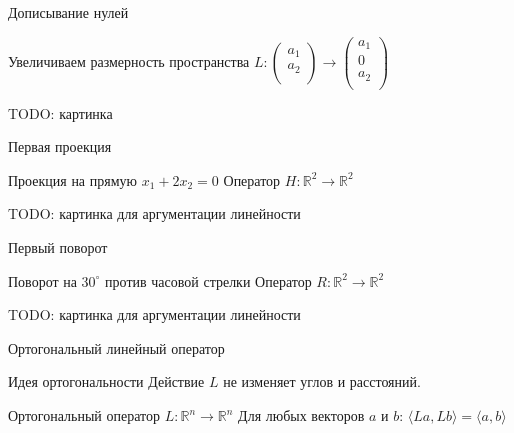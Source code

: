 \documentclass[14pt,xcolor=dvipsnames]{beamer}
\newcommand\R{\mathbb{R}}
\begin{document}
\begin{frame}{Дописывание нулей}

\begin{block}{Увеличиваем размерность пространства}
  $L : \begin{pmatrix}
    a_1 \\
    a_2 \\
  \end{pmatrix} \to 
  \begin{pmatrix}
    a_1 \\
    0  \\
    a_2 \\
  \end{pmatrix}$
\end{block}

\begin{block}{TODO: картинка}

\end{block}
    
\end{frame}
  



\begin{frame}{Первая проекция}

\begin{block}{Проекция на прямую $x_1 + 2x_2 = 0$}
Оператор $H: \R^2 \to \R^2$ 

TODO: картинка для аргументации линейности
\end{block}

\end{frame}
  

\begin{frame}{Первый поворот}

\begin{block}{Поворот на $30^{\circ}$ против часовой стрелки}
Оператор $R: \R^2 \to \R^2$ 

TODO: картинка для аргументации линейности
\end{block}

\end{frame}
  
\begin{frame}{Ортогональный линейный оператор}

\begin{block}{Идея ортогональности}
  Действие $L$ не изменяет углов и расстояний. 
\end{block}


\begin{block}{Ортогональный оператор $L : \R^n \to \R^n$}
 Для любых векторов $a$ и $b$: $\langle La, Lb \rangle = \langle a, b\rangle$
\end{block}



\end{frame}
  
\end{document}
